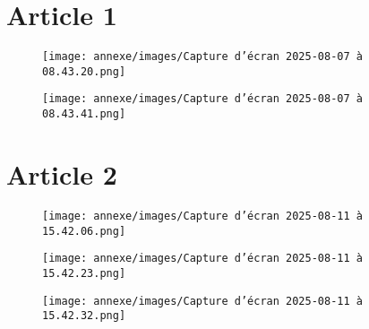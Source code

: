 \section{Article 1}
\begin{figure}[H]
    \centering
    \texttt{[image: annexe/images/Capture d’écran 2025-08-07 à 08.43.20.png]} 
    \label{articlemoto}
\end{figure}
\begin{figure}[H]
    \centering
    \texttt{[image: annexe/images/Capture d’écran 2025-08-07 à 08.43.41.png]} 
\end{figure}


\section{Article 2}
\begin{figure}[H]
    \centering
    \texttt{[image: annexe/images/Capture d’écran 2025-08-11 à 15.42.06.png]} 
    \label{articlevoiture}
\end{figure}
\begin{figure}[H]
    \centering
    \texttt{[image: annexe/images/Capture d’écran 2025-08-11 à 15.42.23.png]} 
\end{figure}
\begin{figure}[H]
    \centering
    \texttt{[image: annexe/images/Capture d’écran 2025-08-11 à 15.42.32.png]} 
\end{figure}